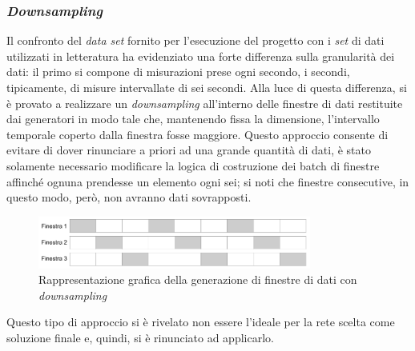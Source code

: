 \documentclass[12pt,a4paper,fleqn]{article}
\begin{document}
\subsubsection{\textsl{Downsampling}}
Il confronto del \textsl{data set} fornito per l'esecuzione del progetto con i \textsl{set} di dati utilizzati in letteratura ha evidenziato una forte differenza sulla granularità dei dati: il primo si compone di misurazioni prese ogni secondo, i secondi, tipicamente, di misure intervallate di sei secondi. Alla luce di questa differenza, si è provato a realizzare un \textsl{downsampling} all'interno delle finestre di dati restituite dai generatori in modo tale che, mantenendo fissa la dimensione, l'intervallo temporale coperto dalla finestra fosse maggiore. Questo approccio consente di evitare di dover rinunciare a priori ad una grande quantità di dati, è stato solamente necessario modificare la logica di costruzione dei batch di finestre affinché ognuna prendesse un elemento ogni sei; si noti che finestre consecutive, in questo modo, però, non avranno dati sovrapposti.

\begin{figure}
\centering
\includegraphics[width=0.8\textwidth]{images/windows.png}
\caption{Rappresentazione grafica della generazione di finestre di dati con \textsl{downsampling}}
\label{fig:finestre}
\end{figure}

Questo tipo di approccio si è rivelato non essere l'ideale per la rete scelta come soluzione finale e, quindi, si è rinunciato ad applicarlo.
\end{document}
